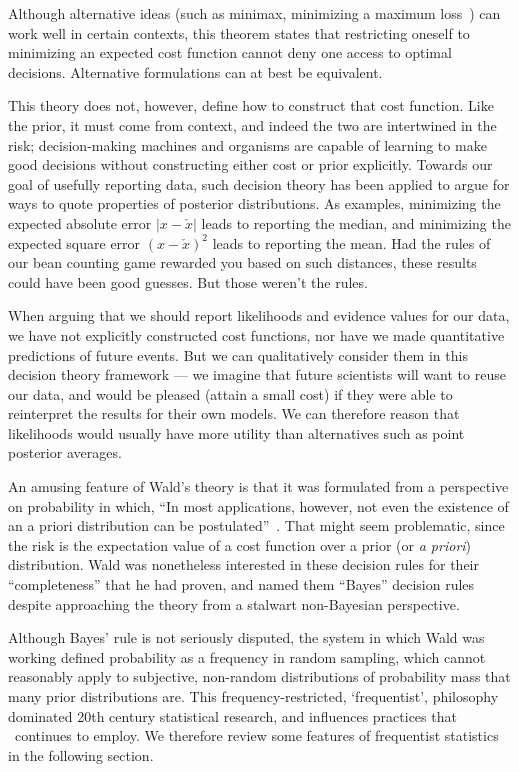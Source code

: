 Although alternative ideas (such as minimax, minimizing a maximum
loss~\cite{savage1951review}) can work well in certain contexts, this theorem
states that restricting oneself to minimizing an expected cost function cannot
deny one access to optimal decisions.
Alternative formulations can at best be equivalent.

This theory does not, however, define how to construct that cost function.
Like the prior, it must come from context, and indeed the two are intertwined
in the risk;
decision-making machines and organisms are capable of learning to make good
decisions without constructing either cost or prior explicitly.
Towards our goal of usefully reporting data, such decision theory has been
applied to argue for ways to quote properties of posterior distributions.
As examples, minimizing the expected absolute error $|x - \check{x}|$ leads
to reporting the median, and minimizing the expected square error
$(x - \check{x})^2$ leads to reporting the mean.
Had the rules of our bean counting game rewarded you based on such distances,
these results could have been good guesses. But those weren't the rules.

When arguing that we should report likelihoods and evidence values for our
data, we have not explicitly constructed cost functions, nor have we made
quantitative predictions of future events.
But we can qualitatively consider them in this decision theory framework ---
we imagine that future scientists will want to reuse our data, and would be
pleased (attain a small cost) if they were able to reinterpret the results for
their own models.
We can therefore reason that likelihoods would usually have more utility than
alternatives such as point posterior averages.

An amusing feature of Wald's theory is that it was formulated from a
perspective on probability in which,
``In most applications, however, not even the existence of an a priori
distribution can be postulated''~\cite{wald1950bayes}.
That might seem problematic, since the risk is the expectation value of a cost
function over a prior (or \emph{a priori}) distribution.
Wald was nonetheless interested in these decision rules for their
``completeness'' that he had proven, and named them ``Bayes'' decision rules
despite approaching the theory from a stalwart non-Bayesian perspective.

Although Bayes' rule is not seriously disputed, the system in which Wald was
working defined probability as a frequency in random sampling, which cannot
reasonably apply to subjective, non-random distributions of probability mass
that many prior distributions are.
This frequency-restricted, `frequentist', philosophy dominated 20th century
statistical research, and influences practices that \atlas\ continues to
employ.
We therefore review some features of frequentist statistics in the following
section.

